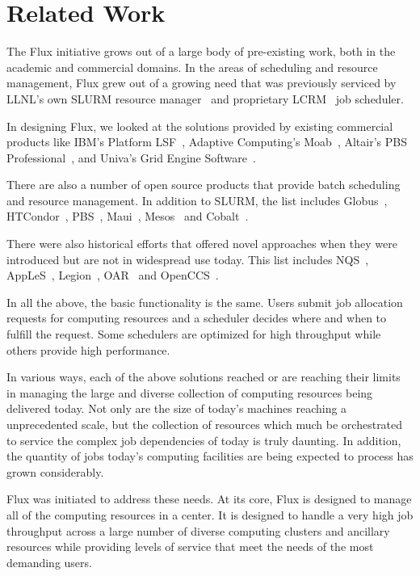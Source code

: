 \section{Related Work}

The Flux initiative grows out of a large body of pre-existing work,
both in the academic and commercial domains.  In the areas of
scheduling and resource management, Flux grew out of a growing need
that was previously serviced by LLNL's own SLURM resource
manager~\cite{Jette02slurm} and proprietary LCRM~\cite{LCRM} job
scheduler.

In designing Flux, we looked at the solutions provided by existing
commercial products like IBM's Platform LSF~\cite{LSF}, Adaptive
Computing's Moab~\cite{Moab}, Altair's PBS Professional~\cite{PSBPro},
and Univa's Grid Engine Software~\cite{UnivaGE}.

There are also a number of open source products that provide batch
scheduling and resource management.  In addition to SLURM, the list
includes Globus~\cite{GlobusToolkit},
HTCondor~\cite{Litzkow88,Raman98}, PBS~\cite{PBS},
Maui~\cite{Jackson01corealgorithms}, Mesos~\cite{Mesos} and
Cobalt~\cite{Cobalt}.

There were also historical efforts that offered novel approaches when
they were introduced but are not in widespread use today.  This list
includes NQS~\cite{NQS}, AppLeS~\cite{AppLeS},
Legion~\cite{LegionRM,LegionGrid}, OAR~\cite{Oar} and
OpenCCS~\cite{Keller98ccsresource}.

In all the above, the basic functionality is the same.  Users submit
job allocation requests for computing resources and a scheduler
decides where and when to fulfill the request.  Some schedulers are
optimized for high throughput while others provide high performance.

In various ways, each of the above solutions reached or are reaching
their limits in managing the large and diverse collection of computing
resources being delivered today.  Not only are the size of today's
machines reaching a unprecedented scale, but the collection of
resources which much be orchestrated to service the complex job
dependencies of today is truly daunting.  In addition, the quantity of
jobs today's computing facilities are being expected to process has
grown considerably.

Flux was initiated to address these needs.  At its core, Flux is
designed to manage all of the computing resources in a center.  It is
designed to handle a very high job throughput across a large number of
diverse computing clusters and ancillary resources while providing
levels of service that meet the needs of the most demanding users.

